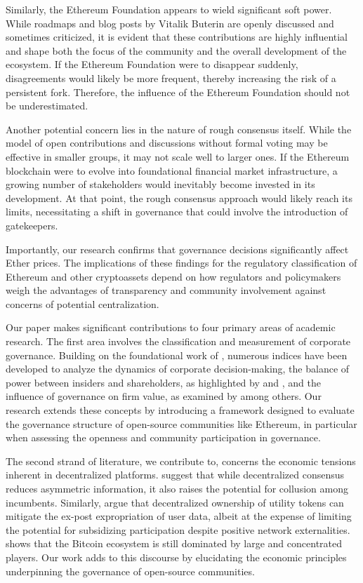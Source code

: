 \documentclass[No]{AEA}
\begin{document}
Similarly, the Ethereum Foundation appears to wield significant soft power. While roadmaps and blog posts by Vitalik Buterin are openly discussed and sometimes criticized, it is evident that these contributions are highly influential and shape both the focus of the community and the overall development of the ecosystem. If the Ethereum Foundation were to disappear suddenly, disagreements would likely be more frequent, thereby increasing the risk of a persistent fork. Therefore, the influence of the Ethereum Foundation should not be underestimated.

Another potential concern lies in the nature of rough consensus itself. While the model of open contributions and discussions without formal voting may be effective in smaller groups, it may not scale well to larger ones. If the Ethereum blockchain were to evolve into foundational financial market infrastructure, a growing number of stakeholders would inevitably become invested in its development. At that point, the rough consensus approach would likely reach its limits, necessitating a shift in governance that could involve the introduction of gatekeepers.

Importantly, our research confirms that governance decisions significantly affect Ether prices. The implications of these findings for the regulatory classification of Ethereum and other cryptoassets depend on how regulators and policymakers weigh the advantages of transparency and community involvement against concerns of potential centralization.

Our paper makes significant contributions to four primary areas of academic research. The first area involves the classification and measurement of corporate governance. Building on the foundational work of \cite{Gompers_Ishii2003}, numerous indices have been developed to analyze the dynamics of corporate decision-making, the balance of power between insiders and shareholders, as highlighted by \cite{JensenMeckling1976} and \cite{Bebchuketal2009}, and the influence of governance on firm value, as examined by \cite{Coreetal2006} among others. Our research extends these concepts by introducing a framework designed to evaluate the governance structure of open-source communities like Ethereum, in particular when assessing the openness and community participation in governance.

The second strand of literature, we contribute to, concerns the economic tensions inherent in decentralized platforms. \cite{Cong_Zhiguo2019} suggest that while decentralized consensus reduces asymmetric information, it also raises the potential for collusion among incumbents. Similarly, \cite{Sockin_Xiong2023} argue that decentralized ownership of utility tokens can mitigate the ex-post expropriation of user data, albeit at the expense of limiting the potential for subsidizing participation despite positive network externalities. \cite{MakarovSchoar22} shows that the Bitcoin ecosystem is still dominated by large and concentrated players. Our work adds to this discourse by elucidating the economic principles underpinning the governance of open-source communities. 
\end{document}
